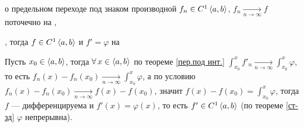 \begin{teor}[https://www.youtube.com/live/Ebv-BznzM6k?si=sIF3m4zsCUBLspCI&t=10900]{о предельном переходе под знаком производной}\label{пер.под призв.}
	$f_n \in C^1\left<a, b\right>$, $f_n \xrightarrow[n \to \infty]{} f$ поточечно на ,\!, тогда $f \in C^1$ и $f' = \varphi$ на \scal{a, b}
\end{teor} %

\begin{prf} %
		Пусть $x_0 \in \left<a, b\right>$, тогда $\forall \, x \in \left<a, b\right>$ по теореме \ref{пер.под инт.} $\int_{x_0}^{x} f'_n \xrightarrow[n \to \infty]{} \int_{x_0}^{x} \varphi$, то есть $f_n(x) - f_n(x_0) \xrightarrow[n \to \infty]{} \int_{x_0}^{x} \varphi$, а по условию $f_n(x) - f_n(x_0) \xrightarrow[n \to \infty]{} f(x) - f(x_0)$, значит $f(x) - f(x_0) = \int_{x_0}^{x} \varphi$, \linebreak тогда  $f$ --- \smallskip дифференцируема и $f'(x) = \varphi(x)$, то есть $f' \in C^1 \left<a, b\right>$ (по теореме \ref{ст-зд} $\varphi$ непрерывна).
\end{prf} %
